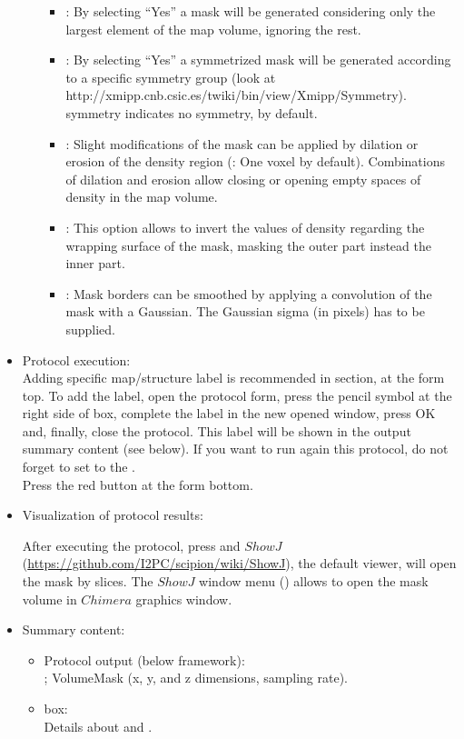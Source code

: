 \begin{itemize}
\begin{itemize}
\begin{itemize}
     \item {}: By selecting ``Yes'' a mask will be generated considering only the largest element of the map volume, ignoring the rest.
     \item {}: By selecting ``Yes'' a symmetrized mask will be generated according to a specific symmetry group (look at http://xmipp.cnb.csic.es/twiki/bin/view/Xmipp/Symmetry).  symmetry indicates no symmetry, by default.
     \item {}: Slight modifications of the mask can be applied by dilation or erosion of the density region (: One voxel by default). Combinations of dilation and erosion allow closing or opening empty spaces of density in the map volume.
     \item {}: This option allows to invert the values of density regarding the wrapping surface of the mask, masking the outer part instead the inner part.
     \item {}: Mask borders can be smoothed by applying a convolution of the mask with a Gaussian. The Gaussian sigma (in pixels) has to be supplied.
     \end{itemize}

    \end{itemize}
 
 \item Protocol execution:\\
 Adding specific map/structure label is recommended in  section, at the form top. To add the label, open the protocol form, press the pencil symbol at the right side of  box, complete the label in the new opened window, press OK and, finally, close the protocol. This label will be shown in the output summary content (see below). If you want to run again this protocol, do not forget to set to  the .\\
  Press the  red button at the form bottom.
  
  \item Visualization of protocol results:
  
  After executing the protocol, press  and $ShowJ$ (\url{https://github.com/I2PC/scipion/wiki/ShowJ}), the default \scipion viewer, will open the mask by slices. The $ShowJ$ window menu () allows to open the mask volume in $Chimera$ graphics window.

 \item Summary content:
  \begin{itemize}
     \item Protocol output (below \scipion framework):\\ ; VolumeMask (x, y, and z dimensions, sampling rate).
     \item {} box:\\ Details about  and .
    \end{itemize}
    
 \end{itemize}
